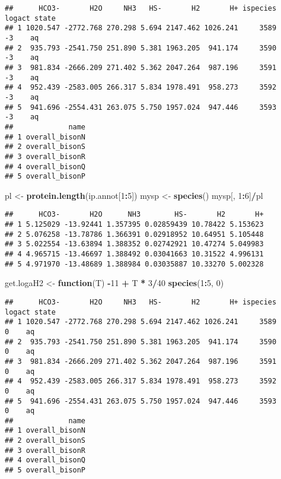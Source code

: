 \documentclass[]{article}
\newenvironment{Shaded}{\begin{snugshade}}{\end{snugshade}}
\newcommand{\KeywordTok}[1]{\textcolor[rgb]{0.13,0.29,0.53}{\textbf{#1}}}
\newcommand{\DecValTok}[1]{\textcolor[rgb]{0.00,0.00,0.81}{#1}}
\newcommand{\StringTok}[1]{\textcolor[rgb]{0.31,0.60,0.02}{#1}}
\newcommand{\ControlFlowTok}[1]{\textcolor[rgb]{0.13,0.29,0.53}{\textbf{#1}}}
\newcommand{\OperatorTok}[1]{\textcolor[rgb]{0.81,0.36,0.00}{\textbf{#1}}}
\newcommand{\NormalTok}[1]{#1}
\begin{document}
\begin{verbatim}
##      HCO3-       H2O     NH3   HS-       H2       H+ ispecies logact state
## 1 1020.547 -2772.768 270.298 5.694 2147.462 1026.241     3589     -3    aq
## 2  935.793 -2541.750 251.890 5.381 1963.205  941.174     3590     -3    aq
## 3  981.834 -2666.209 271.402 5.362 2047.264  987.196     3591     -3    aq
## 4  952.439 -2583.005 266.317 5.834 1978.491  958.273     3592     -3    aq
## 5  941.696 -2554.431 263.075 5.750 1957.024  947.446     3593     -3    aq
##             name
## 1 overall_bisonN
## 2 overall_bisonS
## 3 overall_bisonR
## 4 overall_bisonQ
## 5 overall_bisonP
\end{verbatim}

\begin{Shaded}
\begin{Highlighting}[]
\NormalTok{pl <-}\StringTok{ }\KeywordTok{protein.length}\NormalTok{(ip.annot[}\DecValTok{1}\OperatorTok{:}\DecValTok{5}\NormalTok{])}
\NormalTok{mysp <-}\StringTok{ }\KeywordTok{species}\NormalTok{()}
\NormalTok{mysp[, }\DecValTok{1}\OperatorTok{:}\DecValTok{6}\NormalTok{]}\OperatorTok{/}\NormalTok{pl}
\end{Highlighting}
\end{Shaded}

\begin{verbatim}
##      HCO3-       H2O      NH3        HS-       H2       H+
## 1 5.125029 -13.92441 1.357395 0.02859439 10.78422 5.153623
## 2 5.076258 -13.78786 1.366391 0.02918952 10.64951 5.105448
## 3 5.022554 -13.63894 1.388352 0.02742921 10.47274 5.049983
## 4 4.965715 -13.46697 1.388492 0.03041663 10.31522 4.996131
## 5 4.971970 -13.48689 1.388984 0.03035887 10.33270 5.002328
\end{verbatim}

\begin{Shaded}
\begin{Highlighting}[]
\NormalTok{get.logaH2 <-}\StringTok{ }\ControlFlowTok{function}\NormalTok{(T) }\OperatorTok{-}\DecValTok{11} \OperatorTok{+}\StringTok{ }\NormalTok{T }\OperatorTok{*}\StringTok{ }\DecValTok{3}\OperatorTok{/}\DecValTok{40}
\KeywordTok{species}\NormalTok{(}\DecValTok{1}\OperatorTok{:}\DecValTok{5}\NormalTok{, }\DecValTok{0}\NormalTok{)}
\end{Highlighting}
\end{Shaded}

\begin{verbatim}
##      HCO3-       H2O     NH3   HS-       H2       H+ ispecies logact state
## 1 1020.547 -2772.768 270.298 5.694 2147.462 1026.241     3589      0    aq
## 2  935.793 -2541.750 251.890 5.381 1963.205  941.174     3590      0    aq
## 3  981.834 -2666.209 271.402 5.362 2047.264  987.196     3591      0    aq
## 4  952.439 -2583.005 266.317 5.834 1978.491  958.273     3592      0    aq
## 5  941.696 -2554.431 263.075 5.750 1957.024  947.446     3593      0    aq
##             name
## 1 overall_bisonN
## 2 overall_bisonS
## 3 overall_bisonR
## 4 overall_bisonQ
## 5 overall_bisonP
\end{verbatim}
\end{document}
